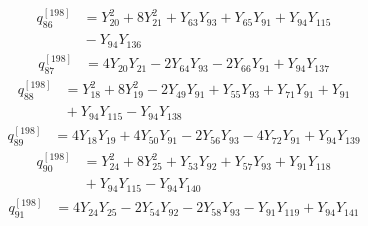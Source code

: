 \begin{equation}\label{q198:row:086}
\begin{aligned}
q_{86}^{[198]} &={} Y_{20}^{2} + 8Y_{21}^{2} + Y_{63}Y_{93} + Y_{65}Y_{91} + Y_{94}Y_{115}\\
&{} - Y_{94}Y_{136}
\end{aligned}
\end{equation}
\begin{equation}\label{q198:row:087}
\begin{aligned}
q_{87}^{[198]} &={} 4Y_{20}Y_{21} - 2Y_{64}Y_{93} - 2Y_{66}Y_{91} + Y_{94}Y_{137}
\end{aligned}
\end{equation}
\begin{equation}\label{q198:row:088}
\begin{aligned}
q_{88}^{[198]} &={} Y_{18}^{2} + 8Y_{19}^{2} - 2Y_{49}Y_{91} + Y_{55}Y_{93} + Y_{71}Y_{91} + Y_{91}\\
&{} + Y_{94}Y_{115} - Y_{94}Y_{138}
\end{aligned}
\end{equation}
\begin{equation}\label{q198:row:089}
\begin{aligned}
q_{89}^{[198]} &={} 4Y_{18}Y_{19} + 4Y_{50}Y_{91} - 2Y_{56}Y_{93} - 4Y_{72}Y_{91} + Y_{94}Y_{139}
\end{aligned}
\end{equation}
\begin{equation}\label{q198:row:090}
\begin{aligned}
q_{90}^{[198]} &={} Y_{24}^{2} + 8Y_{25}^{2} + Y_{53}Y_{92} + Y_{57}Y_{93} + Y_{91}Y_{118}\\
&{} + Y_{94}Y_{115} - Y_{94}Y_{140}
\end{aligned}
\end{equation}
\begin{equation}\label{q198:row:091}
\begin{aligned}
q_{91}^{[198]} &={} 4Y_{24}Y_{25} - 2Y_{54}Y_{92} - 2Y_{58}Y_{93} - Y_{91}Y_{119} + Y_{94}Y_{141}
\end{aligned}
\end{equation}
